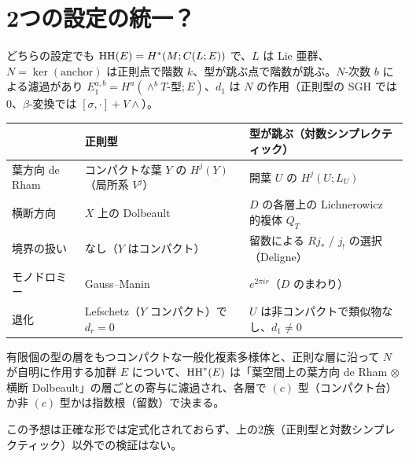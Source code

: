 \section{2つの設定の統一？}\label{p4:sec:unified}
どちらの設定でも $\mathrm{HH}(E)=H^*(M;C(L;E))$ で、$L$ は Lie 亜群、$N=\ker(\text{anchor})$ は正則点で階数 $k$、型が跳ぶ点で階数が跳ぶ。$N$-次数 $b$ による濾過があり $E_1^{a,b}=H^a(\wedge^bT\text{-型};E)$、$d_1$ は $N$ の作用（正則型の SGH では 0、$\beta$-変換では $[\sigma,\cdot]+V\wedge$）。
\begin{center}\small
\begin{tabular}{p{3.2cm}p{5.4cm}p{5.4cm}}\toprule
 & 正則型 & 型が跳ぶ（対数シンプレクティック）\\\midrule
葉方向 de Rham & コンパクトな葉 $Y$ の $H^j(Y)$（局所系 $V^j$） & 開葉 $U$ の $H^j(U;L_U)$ \\\midrule
横断方向 & $X$ 上の Dolbeault & $D$ の各層上の Lichnerowicz 的複体 $Q_T$\\\midrule
境界の扱い & なし（$Y$ はコンパクト） & 留数による $Rj_*$ / $j_!$ の選択（Deligne）\\\midrule
モノドロミー & Gauss--Manin & $e^{2\pi ir}$（$D$ のまわり）\\\midrule
退化 & Lefschetz（$Y$ コンパクト）で $d_r=0$ & $U$ は非コンパクトで類似物なし、$d_1\neq0$\\\bottomrule
\end{tabular}
\end{center}
\begin{conj}\label{p4:conj:U}
有限個の型の層をもつコンパクトな一般化複素多様体と、正則な層に沿って $N$ が自明に作用する加群 $E$ について、$\mathrm{HH}^*(E)$ は「葉空間上の葉方向 de Rham $\otimes$ 横断 Dolbeault」の層ごとの寄与に濾過され、各層で $(c)$ 型（コンパクト台）か非 $(c)$ 型かは指数根（留数）で決まる。
\end{conj}
\noindent この予想は正確な形では定式化されておらず、上の2族（正則型と対数シンプレクティック）以外での検証はない。

